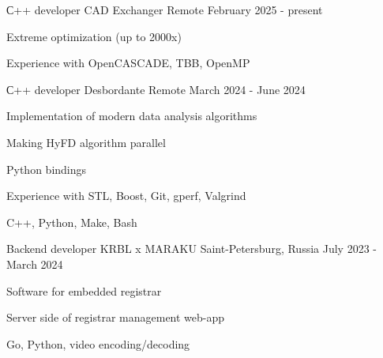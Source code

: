 

\begin{cventries}

  \cventry
    {С++ developer} %
    {CAD Exchanger} %
    {Remote} %
    {February 2025 - present} %
    {
      \begin{cvitems} %
        \item {Extreme optimization (up to 2000x)}
        \item {Experience with OpenCASCADE, TBB, OpenMP}
      \end{cvitems}
    }

  \cventry
    {С++ developer} %
    {Desbordante} %
    {Remote} %
    {March 2024 - June 2024} %
    {
      \begin{cvitems} %
        \item {Implementation of modern data analysis algorithms}
        \item {Making HyFD algorithm parallel}
        \item {Python bindings}
        \item {Experience with STL, Boost, Git, gperf, Valgrind}
        \item {C++, Python, Make, Bash}
      \end{cvitems}
    }

  \cventry
    {Backend developer} %
    {KRBL x MARAKU} %
    {Saint-Petersburg, Russia} %
    {July 2023 - March 2024} %
    {
      \begin{cvitems} %
        \item {Software for embedded registrar}
        \item {Server side of registrar management web-app}
        \item {Go, Python, video encoding/decoding}
      \end{cvitems}
    }

\end{cventries}
